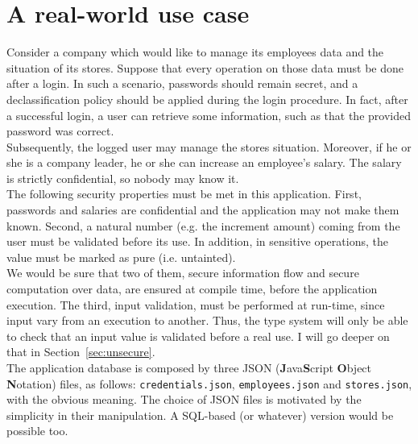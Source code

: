 \section{A real-world use case}\label{sec:example}
Consider a company which would like to manage its employees data and the situation of its stores. Suppose that every operation on those data must be done after a login. In such a scenario, passwords should remain secret, and a declassification policy should be applied during the login procedure. In fact, after a successful login, a user can retrieve some information, such as that the provided password was correct. \\
Subsequently, the logged user may manage the stores situation. Moreover, if he or she is a company leader, he or she can increase an employee's salary. The salary is strictly confidential, so nobody may know it. \\
The following security properties must be met in this application. First, passwords and salaries are confidential and the application may not make them known. Second, a natural number (e.g. the increment amount) coming from the user must be validated before its use. In addition, in sensitive operations, the value must be marked as pure (i.e. untainted). \\
We would be sure that two of them, secure information flow and secure computation over data, are ensured at compile time, before the application execution. The third, input validation, must be performed at run-time, since input vary from an execution to another. Thus, the type system will only be able to check that an input value is validated before a real use. I will go deeper on that in Section~\ref{sec:unsecure}. \\
The application database is composed by three JSON (\textbf{J}ava\textbf{S}cript \textbf{O}bject \textbf{N}otation) files, as follows: \texttt{credentials.json}, \texttt{employees.json} and \texttt{stores.json}, with the obvious meaning. The choice of JSON files is motivated by the simplicity in their manipulation. A SQL-based (or whatever) version would be possible too.
